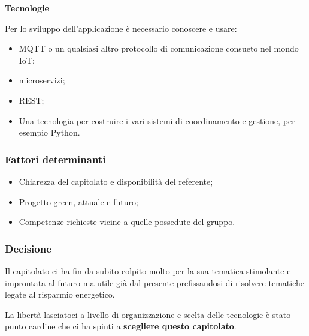 \textbf{Tecnologie}

Per lo sviluppo dell'applicazione è necessario conoscere e usare:
\begin{itemize}
    \item MQTT o un qualsiasi altro protocollo di comunicazione consueto nel mondo IoT;
    \item microservizi;
    \item REST;
    \item Una tecnologia per costruire i vari sistemi di coordinamento e gestione, per esempio Python.
\end{itemize}



\subsubsection{Fattori determinanti}
\begin{itemize}
    \item Chiarezza del capitolato e disponibilità del referente;
    \item Progetto green, attuale e futuro;
    \item Competenze richieste vicine a quelle possedute del gruppo.
\end{itemize}

\subsubsection{Decisione}
Il capitolato ci ha fin da subito colpito molto per la sua tematica stimolante e improntata al futuro ma utile già dal presente prefissandosi di risolvere tematiche legate al risparmio energetico.

La libertà lasciatoci a livello di organizzazione e scelta delle tecnologie è stato punto cardine che ci ha spinti a \textbf{scegliere questo capitolato}.
